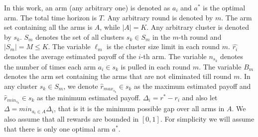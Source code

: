 In this work, an arm (any arbitrary one) is denoted as $a_{i}$ and $a^{*}$ is the optimal arm. The total time horizon is $T$. Any arbitrary round is denoted by $m$. The arm set containing all the arms is $A$, while $|A|=K$. Any arbitrary cluster is denoted by $s_{k}$. $S_{m}$ denotes the set of all clusters $s_{k}\in S_{m}$ in the $m$-th round and $|S_{m}|=M\leq K$. The variable $\ell_{m}$ is the cluster size limit in each round $m$.
$\hat{r_i}$ denotes the average estimated payoff of the $i$-th arm. The variable $n_{s_{k}}$ denotes the number of times each arm $a_{i}\in s_{k}$ is pulled in each round $m$. The variable $B_{m}$ denotes the arm set containing the arms that are not eliminated till round $m$. 
 In any cluster $s_{k}\in S_{m}$, we denote $\hat{r}_{max_{s_{k}}}\in s_{k}$ as the maximum estimated payoff and $\hat{r}_{min_{s_{k}}}\in s_{k}$ as the minimum estimated payoff. $\Delta_{i}=r^{*}-r_{i}$ and also let $\Delta=min_{a_{i}\in A}\Delta_{i}$, that is it is the minimum possible gap over all arms in $A$.%
We also assume that all rewards are bounded in $[0,1]$. For simplicity we will assume that there is only one optimal arm $a^{*}$.
